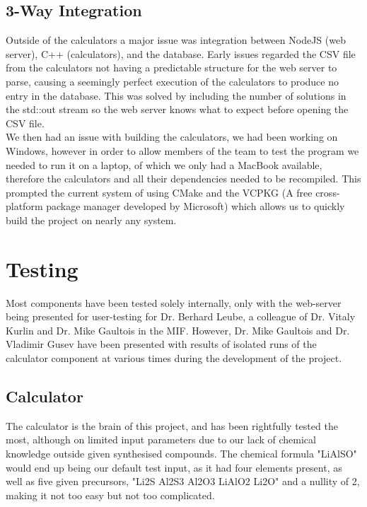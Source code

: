 \subsection*{3-Way Integration}
Outside of the calculators a major issue was integration between NodeJS (web server), C++ (calculators), and the database. Early issues regarded the CSV file from the calculators not having a predictable structure for the web server to parse, causing a seemingly perfect execution of the calculators to produce no entry in the database. This was solved by including the number of solutions in the std::out stream so the web server knows what to expect before opening the CSV file. \\

We then had an issue with building the calculators, we had been working on Windows, however in order to allow members of the team to test the program we needed to run it on a laptop, of which we only had a MacBook available, therefore the calculators and all their dependencies needed to be recompiled. This prompted the current system of using CMake and the VCPKG (A free cross-platform package manager developed by Microsoft) which allows us to quickly build the project on nearly any system.

\section{Testing}
Most components have been tested solely internally, only with the web-server being presented for user-testing for Dr. Berhard Leube, a colleague of Dr. Vitaly Kurlin and Dr. Mike Gaultois in the MIF. However, Dr. Mike Gaultois and Dr. Vladimir Gusev have been presented with results of isolated runs of the calculator component at various times during the development of the project. \\

\subsection{Calculator}
The calculator is the brain of this project, and has been rightfully tested the most, although on limited input parameters due to our lack of chemical knowledge outside given synthesised compounds. The chemical formula "LiAlSO" would end up being our default test input, as it had four elements present, as well as five given precursors, "Li2S Al2S3 Al2O3 LiAlO2 Li2O" and a nullity of 2, making it not too easy but not too complicated. \\

